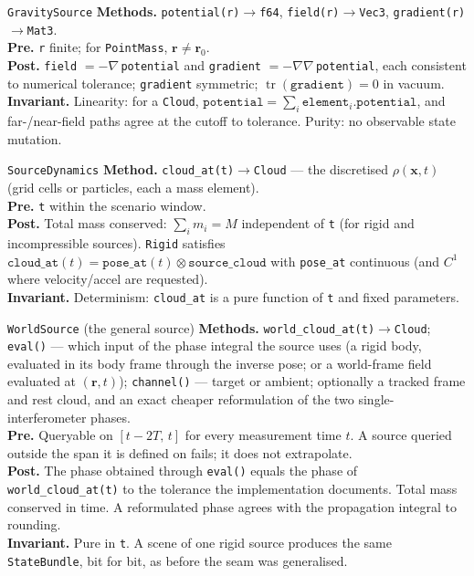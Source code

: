 \documentclass[11pt,a4paper]{article}
\theoremstyle{reqstyle}
\newcommand{\rv}{\mathbf{r}}
\newcommand{\xv}{\mathbf{x}}
\newcommand{\grad}{\nabla}
\DeclareMathOperator{\tr}{tr}
\begin{document}
\begin{contractbox}{\texttt{GravitySource}}
\textbf{Methods.} \texttt{potential(r)$\to$f64}, \texttt{field(r)$\to$Vec3},
\texttt{gradient(r)$\to$Mat3}.\\
\textbf{Pre.} \texttt{r} finite; for \texttt{PointMass}, $\rv\neq\rv_0$.\\
\textbf{Post.} \texttt{field} $=-\grad$\,\texttt{potential} and \texttt{gradient}
$=-\nabla\grad$\,\texttt{potential}, each consistent to numerical tolerance;
\texttt{gradient} symmetric; $\tr(\texttt{gradient})=0$ in vacuum.\\
\textbf{Invariant.} Linearity: for a \texttt{Cloud},
$\texttt{potential}=\sum_i \texttt{element}_i.\texttt{potential}$, and far-/near-field paths
agree at the cutoff to tolerance. Purity: no observable state mutation.
\end{contractbox}

\begin{contractbox}{\texttt{SourceDynamics}}
\textbf{Method.} \texttt{cloud\_at(t)$\to$Cloud} --- the discretised $\rho(\xv,t)$ (grid
cells or particles, each a mass element).\\
\textbf{Pre.} \texttt{t} within the scenario window.\\
\textbf{Post.} Total mass conserved: $\sum_i m_i = M$ independent of \texttt{t} (for rigid and
incompressible sources). \texttt{Rigid} satisfies
$\texttt{cloud\_at}(t)=\texttt{pose\_at}(t)\otimes\texttt{source\_cloud}$ with
\texttt{pose\_at} continuous (and $C^1$ where velocity/accel are requested).\\
\textbf{Invariant.} Determinism: \texttt{cloud\_at} is a pure function of \texttt{t} and
fixed parameters.
\end{contractbox}

\begin{contractbox}{\texttt{WorldSource} (the general source)}
\textbf{Methods.} \texttt{world\_cloud\_at(t)$\to$Cloud}; \texttt{eval()} --- which input of
the phase integral the source uses (a rigid body, evaluated in its body frame through the
inverse pose; or a world-frame field evaluated at $(\rv,t)$); \texttt{channel()} --- target
or ambient; optionally a tracked frame and rest cloud, and an exact cheaper reformulation of
the two single-interferometer phases.\\
\textbf{Pre.} Queryable on $[t-2T,\,t]$ for every measurement time $t$. A source queried
outside the span it is defined on fails; it does not extrapolate.\\
\textbf{Post.} The phase obtained through \texttt{eval()} equals the phase of
\texttt{world\_cloud\_at(t)} to the tolerance the implementation documents. Total mass
conserved in time. A reformulated phase agrees with the propagation integral to rounding.\\
\textbf{Invariant.} Pure in \texttt{t}. A scene of one rigid source produces the same
\texttt{StateBundle}, bit for bit, as before the seam was generalised.
\end{contractbox}
\end{document}
